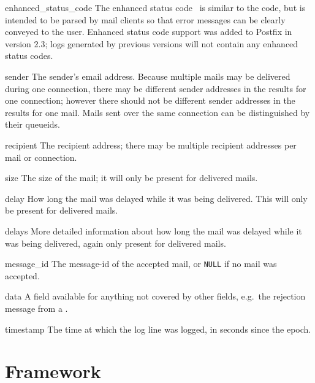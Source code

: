 \begin{boldeqlist}
    \item [enhanced\_status\_code] The enhanced status code~\cite{RFC3463}
        is similar to the  code, but is intended to be parsed
        by mail clients so that error messages can be clearly conveyed to
        the user.  Enhanced status code support was added to Postfix in
        version 2.3; logs generated by previous versions will not contain
        any enhanced status codes.

    \item [sender] The sender's email address.  Because multiple mails may
        be delivered during one connection, there may be different sender
        addresses in the results for one connection; however there should
        not be different sender addresses in the results for one mail.
        Mails sent over the same connection can be distinguished by their
        queueids.

    \item [recipient] The recipient address; there may be multiple
        recipient addresses per mail or connection.

    \item [size] The size of the mail; it will only be present for
        delivered mails.

    \item [delay] How long the mail was delayed while it was being
        delivered.  This will only be present for delivered mails.

    \item [delays] More detailed information about how long the mail was
        delayed while it was being delivered, again only present for
        delivered mails.

    \item [message\_id] The message-id of the accepted mail, or
        \texttt{NULL} if no mail was accepted.

    \item [data] A field available for anything not covered by other
        fields, e.g.\ the rejection message from a \@.

    \item [timestamp] The time at which the log line was logged, in seconds
        since the epoch.

\end{boldeqlist}



\section{Framework}

